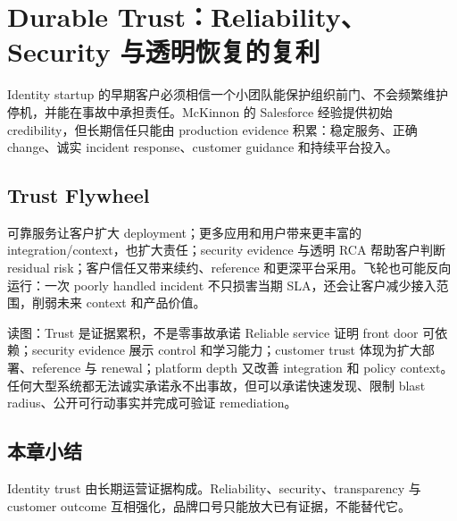 \section{Durable Trust：Reliability、Security 与透明恢复的复利}

Identity startup 的早期客户必须相信一个小团队能保护组织前门、不会频繁维护停机，并能在事故中承担责任。McKinnon 的 Salesforce 经验提供初始 credibility，但长期信任只能由 production evidence 积累：稳定服务、正确 change、诚实 incident response、customer guidance 和持续平台投入。

\subsection{Trust Flywheel}

可靠服务让客户扩大 deployment；更多应用和用户带来更丰富的 integration/context，也扩大责任；security evidence 与透明 RCA 帮助客户判断 residual risk；客户信任又带来续约、reference 和更深平台采用。飞轮也可能反向运行：一次 poorly handled incident 不只损害当期 SLA，还会让客户减少接入范围，削弱未来 context 和产品价值。


\begin{knowledgebox}{读图：Trust 是证据累积，不是零事故承诺}
Reliable service 证明 front door 可依赖；security evidence 展示 control 和学习能力；customer trust 体现为扩大部署、reference 与 renewal；platform depth 又改善 integration 和 policy context。任何大型系统都无法诚实承诺永不出事故，但可以承诺快速发现、限制 blast radius、公开可行动事实并完成可验证 remediation。
\end{knowledgebox}


\subsection{本章小结}

Identity trust 由长期运营证据构成。Reliability、security、transparency 与 customer outcome 互相强化，品牌口号只能放大已有证据，不能替代它。

